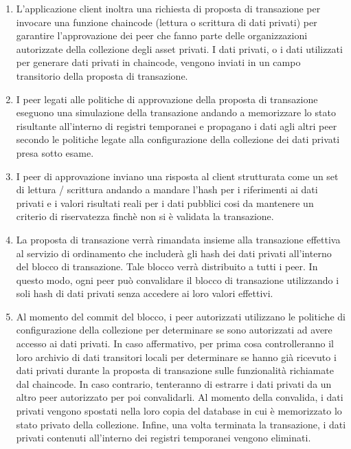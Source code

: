 \begin{enumerate}
    \item L'applicazione client inoltra una richiesta di proposta di transazione per invocare una funzione chaincode (lettura o scrittura di dati privati) per garantire l'approvazione dei peer che fanno parte delle organizzazioni autorizzate della collezione degli asset privati. I dati privati, o i dati utilizzati per generare dati privati in chaincode, vengono inviati in un campo transitorio della proposta di transazione. 
    \item I peer legati alle politiche di approvazione della proposta di transazione eseguono una simulazione della transazione andando a memorizzare lo stato risultante all'interno di registri temporanei e propagano i dati agli altri peer secondo le politiche legate alla configurazione della collezione dei dati privati presa sotto esame. 
    \item I peer di approvazione inviano una risposta al client strutturata come un set di lettura / scrittura andando a mandare l'hash per i riferimenti ai dati privati e i valori risultati reali per i dati pubblici cosi da mantenere un criterio di riservatezza finchè non si è validata la transazione. 
    \item La proposta di transazione verrà rimandata insieme alla transazione effettiva al servizio di ordinamento che includerà gli hash dei dati privati all'interno del blocco di transazione. Tale blocco verrà distribuito a tutti i peer. In questo modo, ogni peer può convalidare il blocco di transazione utilizzando i soli hash di dati privati senza accedere ai loro valori effettivi.
    \item Al momento del commit del blocco, i peer autorizzati utilizzano le politiche di configurazione della collezione per determinare se sono autorizzati ad avere accesso ai dati privati. In caso affermativo, per prima cosa controlleranno il loro archivio di dati transitori locali per determinare se hanno già ricevuto i dati privati durante la proposta di transazione sulle funzionalità richiamate dal chaincode. In caso contrario, tenteranno di estrarre i dati privati da un altro peer autorizzato per poi convalidarli. Al momento della convalida, i dati privati vengono spostati nella loro copia del database in cui è memorizzato lo stato privato della collezione. Infine, una volta terminata la transazione, i dati privati contenuti all'interno dei registri temporanei vengono eliminati. 
\end{enumerate}
